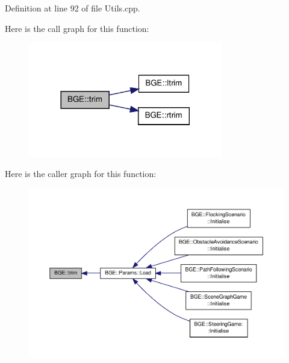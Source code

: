 Definition at line 92 of file Utils.\-cpp.



Here is the call graph for this function\-:
\nopagebreak
\begin{figure}[H]
\begin{center}
\leavevmode
\includegraphics[width=240pt]{namespace_b_g_e_a65bfe22b3a4b03bf32837ac39a8a6aaf_cgraph}
\end{center}
\end{figure}




Here is the caller graph for this function\-:
\nopagebreak
\begin{figure}[H]
\begin{center}
\leavevmode
\includegraphics[width=350pt]{namespace_b_g_e_a65bfe22b3a4b03bf32837ac39a8a6aaf_icgraph}
\end{center}
\end{figure}


